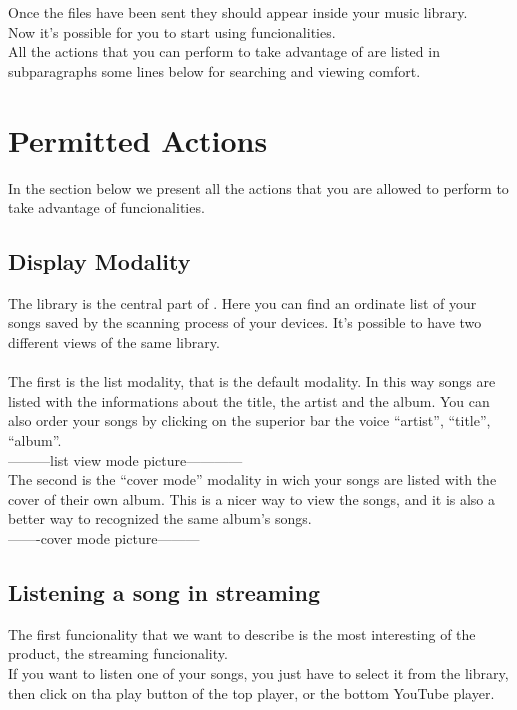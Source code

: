 Once the files have been sent they should appear inside your music library.\\
Now it's possible for you to start using  funcionalities.\\
All the actions that you can perform to take advantage of  are listed
in subparagraphs some lines below for searching and viewing comfort.


\section{Permitted Actions}
In the section below we present all the actions that you are allowed to perform
to take advantage of  funcionalities.

\subsection{Display Modality}

The library is the central part of . Here you can find an ordinate
list of your songs saved by the scanning process of your devices. It's possible
to have two different views of the same library.\\
\\
The first is the list modality, that is the default modality. In this
way songs are listed with the informations about the title, the artist and the
album. You can also order your songs by clicking on the superior bar the voice
``artist'', ``title'', ``album''.\\

---------list view mode picture------------
\\

The second is the ``cover mode'' modality in wich your songs are listed with the
cover of their own album. This is a nicer way to view the songs, and it is also
a better way to recognized the same album's songs.\\

-------cover mode picture---------
\\

 \subsection*{Listening a song in streaming}

The first funcionality that we want to describe is the most interesting of the
product, the streaming funcionality.\\
If you want to listen one of your songs, you just have to select it from the
library, then click on tha play button of the top player, or the
bottom YouTube player.\\

